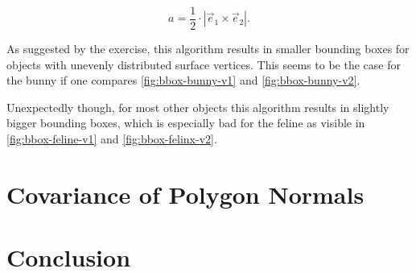 \documentclass[a4paper,10pt,notitlepage]{scrreprt}
\begin{document}
\begin{equation}
 a = \frac{1}{2} \cdot |\vec{e}_1 \times \vec{e}_2|.
\end{equation}

As suggested by the exercise, this algorithm results in smaller bounding boxes
for objects with unevenly distributed surface vertices. This seems to be the
case for the bunny if one compares \ref{fig:bbox-bunny-v1} and
\ref{fig:bbox-bunny-v2}.

Unexpectedly though, for most other objects this algorithm results in slightly
bigger bounding boxes, which is especially bad for the feline as visible in
\ref{fig:bbox-feline-v1} and \ref{fig:bbox-felinx-v2}.

\section{Covariance of Polygon Normals}

\section{Conclusion}
\end{document}
